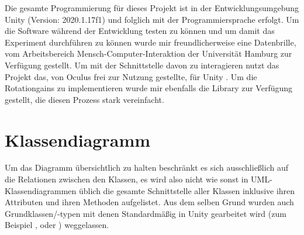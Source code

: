 Die gesamte Programmierung für dieses Projekt ist in der Entwicklungsumgebung Unity (Version: 2020.1.17f1) \cite{unity} und folglich mit der Programmiersprache  erfolgt. Um die Software während der Entwicklung testen zu können und um damit das Experiment durchführen zu können wurde mir freundlicherweise eine  \cite{quest} Datenbrille, vom Arbeitsbereich Mensch-Computer-Interaktion der Universität Hamburg zur Verfügung gestellt. Um mit der Schnittstelle davon zu interagieren nutzt das Projekt das, von Oculus frei zur Nutzung gestellte,  für Unity \cite{integration}. Um die Rotationgains zu implementieren wurde mir ebenfalls die Library  zur Verfügung gestellt, die diesen Prozess stark vereinfacht.

\section{Klassendiagramm}
Um das Diagramm übersichtlich zu halten beschränkt es sich
ausschließlich auf die Relationen zwischen den Klassen, es wird also nicht wie sonst in UML-Klassendiagrammen üblich die gesamte Schnittstelle aller Klassen inklusive ihren Attributen und ihren Methoden aufgelistet.
Aus dem selben Grund wurden auch Grundklassen/-typen mit denen Standardmäßig in Unity gearbeitet wird (zum Beispiel ,  oder ) weggelassen.


